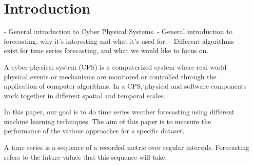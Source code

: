 \section{Introduction}
\label{sec:intro}

- General introduction to Cyber Physical Systems.
- General introduction to forecasting, why it's interesting and what it's used for.
- Different algorithms exist for time series forecasting, and what we would like to focus on.

A cyber-physical system (CPS) is a computerized system where real world physical events or mechanisms are monitored or controlled through the application of computer algorithms.
In a CPS, physical and software components work together in different spatial and temporal scales.

In this paper, our goal is to do time series weather forecasting using different machine learning techniques. 
The aim of this paper is to measure the performance of the various approaches for a specific dataset.

A time series is a sequence of a recorded metric over regular intervals.
Forecasting refers to the future values that this sequence will take.
